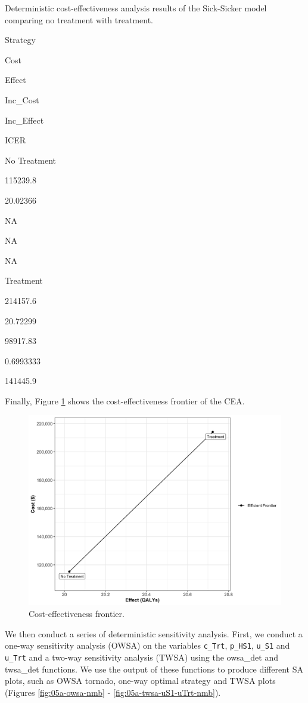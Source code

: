 \documentclass[]{book}
\begin{document}
\label{tab:df-cea-det}Deterministic cost-effectiveness analysis results of
the Sick-Sicker model comparing no treatment with treatment.

Strategy

Cost

Effect

Inc\_Cost

Inc\_Effect

ICER

No Treatment

115239.8

20.02366

NA

NA

NA

Treatment

214157.6

20.72299

98917.83

0.6993333

141445.9

Finally, Figure \ref{fig:05a-CEA-frontier} shows the cost-effectiveness
frontier of the CEA.

\begin{figure}

{\centering \includegraphics[width=1\linewidth]{../figs/05a_cea_frontier} 

}

\caption{Cost-effectiveness frontier.}\label{fig:05a-CEA-frontier}
\end{figure}

We then conduct a series of deterministic sensitivity analysis. First,
we conduct a one-way sensitivity analysis (OWSA) on the variables
\texttt{c\_Trt}, \texttt{p\_HS1}, \texttt{u\_S1} and \texttt{u\_Trt} and
a two-way sensitivity analysis (TWSA) using the owsa\_det and twsa\_det
functions. We use the output of these functions to produce different SA
plots, such as OWSA tornado, one-way optimal strategy and TWSA plots
(Figures \ref{fig:05a-owsa-nmb} - \ref{fig:05a-twsa-uS1-uTrt-nmb}).
\end{document}

